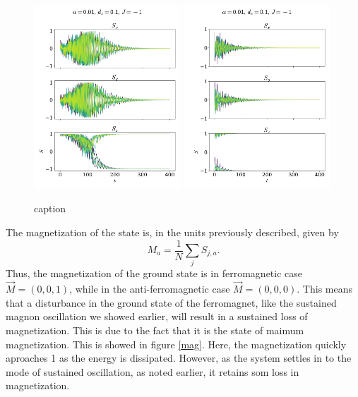 \documentclass{article}
\begin{document}
    \begin{figure}
        \centering
        \includegraphics[width=0.49\textwidth]{../plots/2225.pdf}
        \includegraphics[width=0.49\textwidth]{../plots/22252.pdf}
        \caption{caption}
        \label{one tilted dampend af}
    \end{figure}

    The magnetization of the state is, in the units previously described, given by
    \begin{equation*}
        M_a = \frac{1}{N} \sum_j S_{j, a}.
    \end{equation*}
    Thus, the magnetization of the ground state is in ferromagnetic case $\vec M = (0, 0, 1)$, while in the anti-ferromagnetic case $\vec M = (0, 0, 0)$. This means that a disturbance in the ground state of the ferromagnet, like the sustained magnon oscillation we showed earlier, will result in a sustained loss of magnetization. This is due to the fact that it is the state of maimum magnetization. This is showed in figure \ref{mag}. Here, the magnetization quickly aproaches 1 as the energy is dissipated. However, as the system settles in to the mode of sustained oscillation, as noted earlier, it retains som loss in magnetization. 
\end{document}

